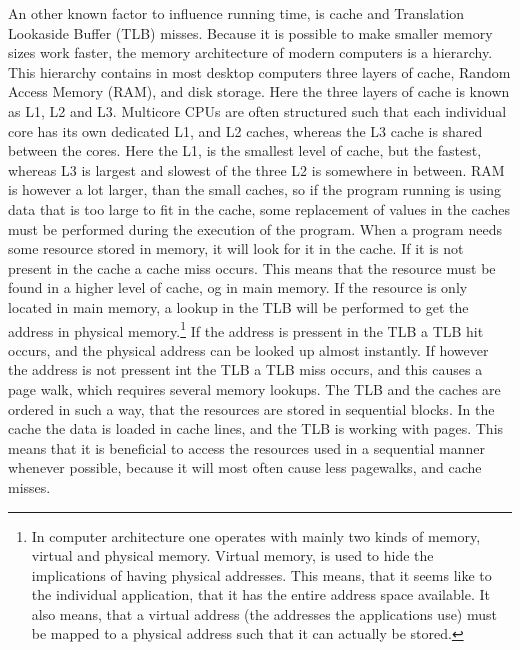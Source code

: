 \documentclass{article}
\begin{document}
An other known factor to influence running time, is cache and Translation Lookaside Buffer (TLB) misses. Because it is possible to make smaller memory sizes work faster, the memory architecture of modern computers is a hierarchy. This hierarchy contains in most desktop computers three layers of cache, Random Access Memory (RAM), and disk storage. Here the three layers of cache is known as L1, L2 and L3. Multicore CPUs are often structured such that each individual core has its own dedicated L1, and L2 caches, whereas the L3 cache is shared between the cores. Here the L1, is the smallest level of cache, but the fastest, whereas L3 is largest and slowest of the three L2 is somewhere in between. RAM is however a lot larger, than the small caches, so if the program running is using data that is too large to fit in the cache, some replacement of values in the caches must be performed during the execution of the program. 
When a program needs some resource stored in memory, it will look for it in the cache. If it is not present in the cache a cache miss occurs. This means that the resource must be found in a higher level of cache, og in main memory. If the resource is only located in main memory, a lookup in the TLB will be performed to get the address in physical memory.\footnote{In computer architecture one operates with mainly two kinds of memory, virtual and physical memory. Virtual memory, is used to hide the implications of having physical addresses. This means, that it seems like to the individual application, that it has the entire address space available. It also means, that a virtual address (the addresses the applications use) must be mapped to a physical address such that it can actually be stored.} If the address is pressent in the TLB a TLB hit occurs, and the physical address can be looked up almost instantly. If however the address is not pressent int the TLB a TLB miss occurs, and this causes a page walk, which requires several memory lookups.
The TLB and the caches are ordered in such a way, that the resources are stored in sequential blocks. In the cache the data is loaded in cache lines, and the TLB is working with pages. This means that it is beneficial to access the resources used in a sequential manner whenever possible, because it will most often cause less pagewalks, and cache misses.
\end{document}
